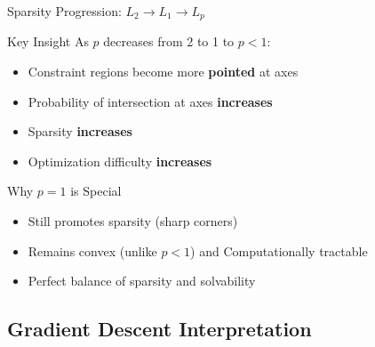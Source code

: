 \documentclass{beamer}
\begin{document}
\begin{frame}{Sparsity Progression: $L_2 \to L_1 \to L_p$}
\begin{theorembox}{Key Insight}
As $p$ decreases from 2 to 1 to $p < 1$:
\begin{itemize}
\item Constraint regions become more \textbf{pointed} at axes
\item Probability of intersection at axes \textbf{increases}
\item Sparsity \textbf{increases}
\item Optimization difficulty \textbf{increases}
\end{itemize}
\end{theorembox}

\begin{examplebox}{Why $p = 1$ is Special}
\begin{itemize}
\item Still promotes sparsity (sharp corners)
\item Remains convex (unlike $p < 1$) and Computationally tractable
\item Perfect balance of sparsity and solvability
\end{itemize}
\end{examplebox}
\end{frame}

\subsection{Gradient Descent Interpretation}
\end{document}
